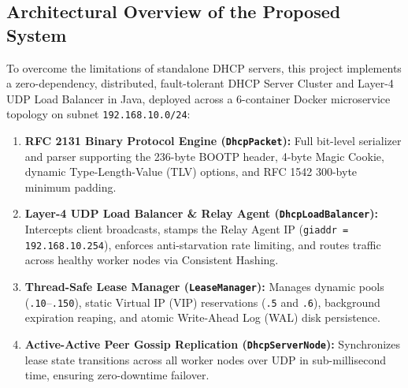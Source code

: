 \documentclass[11pt,a4paper]{article}
\begin{document}
\subsection{Architectural Overview of the Proposed System}
To overcome the limitations of standalone DHCP servers, this project implements a zero-dependency, distributed, fault-tolerant DHCP Server Cluster and Layer-4 UDP Load Balancer in Java, deployed across a 6-container Docker microservice topology on subnet \texttt{192.168.10.0/24}:
\begin{enumerate}[leftmargin=2em]
    \item \textbf{RFC 2131 Binary Protocol Engine (\texttt{DhcpPacket}):} Full bit-level serializer and parser supporting the 236-byte BOOTP header, 4-byte Magic Cookie, dynamic Type-Length-Value (TLV) options, and RFC 1542 300-byte minimum padding.
    \item \textbf{Layer-4 UDP Load Balancer \& Relay Agent (\texttt{DhcpLoadBalancer}):} Intercepts client broadcasts, stamps the Relay Agent IP (\texttt{giaddr = 192.168.10.254}), enforces anti-starvation rate limiting, and routes traffic across healthy worker nodes via Consistent Hashing.
    \item \textbf{Thread-Safe Lease Manager (\texttt{LeaseManager}):} Manages dynamic pools (\texttt{.10}--\texttt{.150}), static Virtual IP (VIP) reservations (\texttt{.5} and \texttt{.6}), background expiration reaping, and atomic Write-Ahead Log (WAL) disk persistence.
    \item \textbf{Active-Active Peer Gossip Replication (\texttt{DhcpServerNode}):} Synchronizes lease state transitions across all worker nodes over UDP in sub-millisecond time, ensuring zero-downtime failover.
\end{enumerate}
\end{document}
